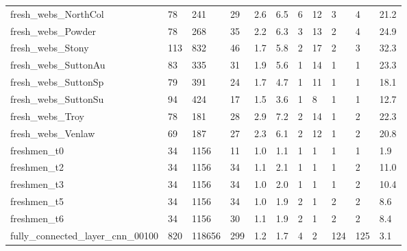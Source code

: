 \begin{longtable}{lllllllllll}
 fresh\_webs\_NorthCol                                & 78         & 241       & 29    & 2.6    & 6.5    & 6     & 12     & 3      & 4      & 21.2    \\
 fresh\_webs\_Powder                                  & 78         & 268       & 35    & 2.2    & 6.3    & 3     & 13     & 2      & 4      & 24.9    \\
 fresh\_webs\_Stony                                   & 113        & 832       & 46    & 1.7    & 5.8    & 2     & 17     & 2      & 3      & 32.3    \\
 fresh\_webs\_SuttonAu                                & 83         & 335       & 31    & 1.9    & 5.6    & 1     & 14     & 1      & 1      & 23.3    \\
 fresh\_webs\_SuttonSp                                & 79         & 391       & 24    & 1.7    & 4.7    & 1     & 11     & 1      & 1      & 18.1    \\
 fresh\_webs\_SuttonSu                                & 94         & 424       & 17    & 1.5    & 3.6    & 1     & 8      & 1      & 1      & 12.7    \\
 fresh\_webs\_Troy                                    & 78         & 181       & 28    & 2.9    & 7.2    & 2     & 14     & 1      & 2      & 22.3    \\
 fresh\_webs\_Venlaw                                  & 69         & 187       & 27    & 2.3    & 6.1    & 2     & 12     & 1      & 2      & 20.8    \\
 freshmen\_t0                                        & 34         & 1156      & 11    & 1.0    & 1.1    & 1     & 1      & 1      & 1      & 1.9     \\
 freshmen\_t2                                        & 34         & 1156      & 34    & 1.1    & 2.1    & 1     & 1      & 1      & 2      & 11.0    \\
 freshmen\_t3                                        & 34         & 1156      & 34    & 1.0    & 2.0    & 1     & 1      & 1      & 2      & 10.4    \\
 freshmen\_t5                                        & 34         & 1156      & 34    & 1.0    & 1.9    & 2     & 1      & 2      & 2      & 8.6     \\
 freshmen\_t6                                        & 34         & 1156      & 30    & 1.1    & 1.9    & 2     & 1      & 2      & 2      & 8.4     \\
 fully\_connected\_layer\_cnn\_00100                    & 820        & 118656    & 299   & 1.2    & 1.7    & 4     & 2      & 124    & 125    & 3.1     \\

\end{longtable}
